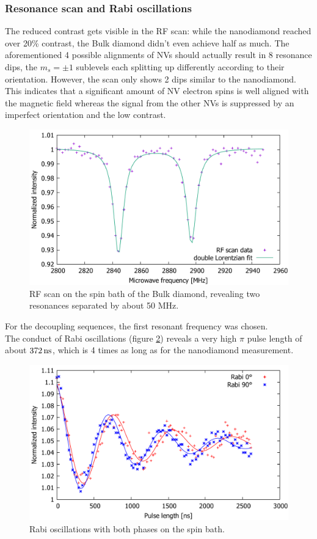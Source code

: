 \documentclass[12pt,a4paper]{article}
\begin{document}
\subsubsection{Resonance scan and Rabi oscillations}
The reduced contrast gets visible in the RF scan: while the nanodiamond reached over 20\% contrast, the Bulk diamond didn't even achieve half as much. The aforementioned 4 possible alignments of NVs should actually result in 8 resonance dips, the $m_s=\pm1$ sublevels each splitting up differently according to their orientation. However, the scan only shows 2 dips similar to the nanodiamond. This indicates that a significant amount of NV electron spins is well aligned with the magnetic field whereas the signal from the other NVs is suppressed by an imperfect orientation and the low contrast.\\
\begin{figure}[H]
\includegraphics[scale=0.6]{rfbulk.pdf} 
\caption{RF scan on the spin bath of the Bulk diamond, revealing two resonances separated by about 50 MHz.}
\label{rfb}
\end{figure}
For the decoupling sequences, the first resonant frequency was chosen.
\\
The conduct of Rabi oscillations (figure \ref{br}) reveals a very high $\pi$ pulse length of about $\unit[372]{ns}$, which is 4 times as long as for the nanodiamond measurement.\\
\begin{figure}[H]
\includegraphics[scale=0.6]{bulkrabi.pdf} 
\caption{Rabi oscillations with both phases on the spin bath.}
\label{br}
\end{figure} 
\end{document}
